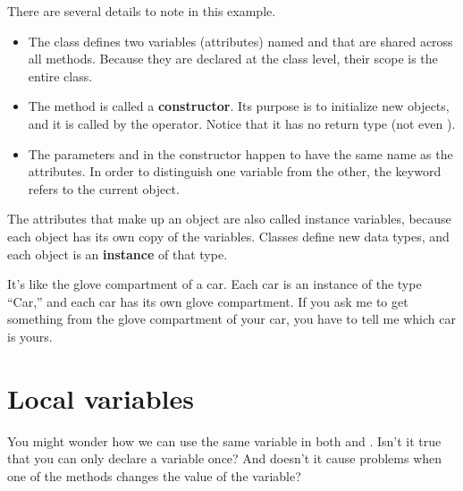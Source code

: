 There are several details to note in this example.

\begin{itemize}

\item The class defines two variables (attributes) named  and  that are shared across all methods.
Because they are declared at the class level, their scope is the entire class.

\item The method  is called a {\bf constructor}.
Its purpose is to initialize new objects, and it is called by the  operator.
Notice that it has no return type (not even ).

\item The parameters  and  in the constructor happen to have the same name as the attributes.
In order to distinguish one variable from the other, the keyword  refers to the current object.


\end{itemize}


The attributes that make up an object are also called instance variables, because each object has its own copy of the variables.
Classes define new data types, and each object is an {\bf instance} of that type.

It's like the glove compartment of a car.
Each car is an instance of the type ``Car,'' and each car has its own glove compartment.
If you ask me to get something from the glove compartment of your car, you have to tell me which car is yours.


\section{Local variables}


You might wonder how we can use the same variable  in both  and .
Isn't it true that you can only declare a variable once?
And doesn't it cause problems when one of the methods changes the value of the variable?

